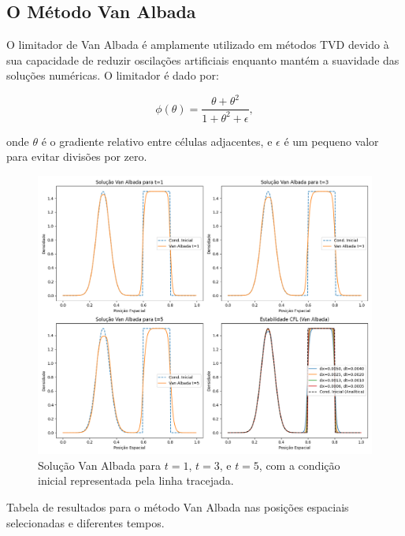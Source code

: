 \subsection{O Método Van Albada}

O limitador de Van Albada é amplamente utilizado em métodos TVD devido à sua capacidade de reduzir oscilações artificiais enquanto mantém a suavidade das soluções numéricas. O limitador é dado por:

\begin{equation}
    \phi(\theta) = \frac{\theta + \theta^2}{1 + \theta^2 + \epsilon},
\end{equation}

onde \(\theta\) é o gradiente relativo entre células adjacentes, e \(\epsilon\) é um pequeno valor para evitar divisões por zero.

\begin{figure}[H]
    \centering
    \includegraphics[width=\textwidth]{code/images/Van Albada.png}
    \caption{Solução Van Albada para \( t=1 \), \( t=3 \), e \( t=5 \), com a condição inicial representada pela linha tracejada.}
\end{figure}

\begin{table}[H]
    \centering
    
    \caption{Tabela de resultados para o método Van Albada nas posições espaciais selecionadas e diferentes tempos.}
    \label{tab:van_albada}
\end{table}

